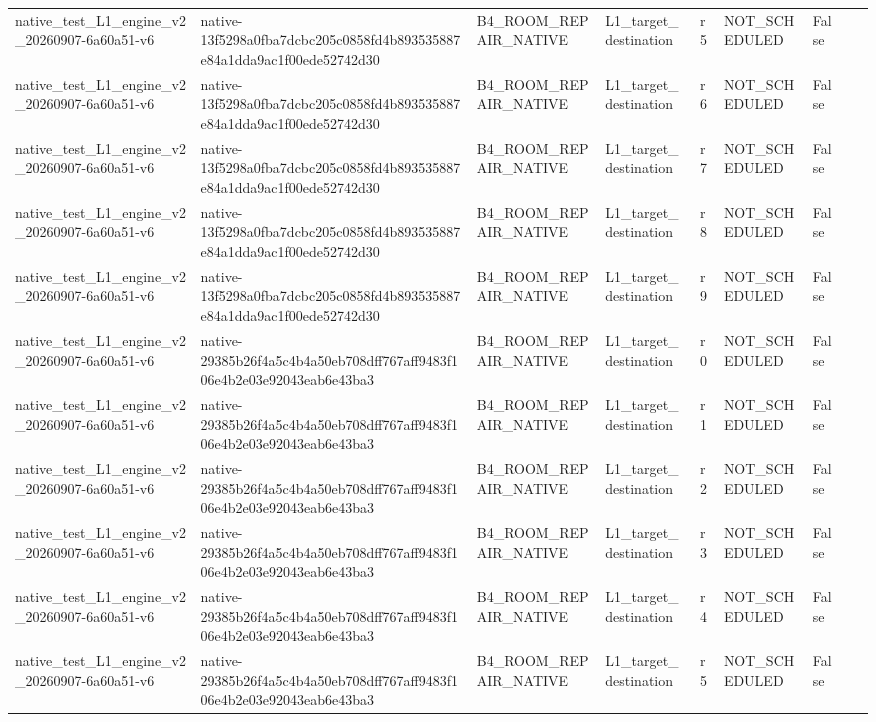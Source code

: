 \begin{tabular}{lllllllll}
native\_test\_L1\_engine\_v2\_20260907-6a60a51-v6 & native-13f5298a0fba7dcbc205c0858fd4b893535887e84a1dda9ac1f00ede52742d30 & B4\_ROOM\_REPAIR\_NATIVE & L1\_target\_destination & r5 & NOT\_SCHEDULED & False &  &  \\
native\_test\_L1\_engine\_v2\_20260907-6a60a51-v6 & native-13f5298a0fba7dcbc205c0858fd4b893535887e84a1dda9ac1f00ede52742d30 & B4\_ROOM\_REPAIR\_NATIVE & L1\_target\_destination & r6 & NOT\_SCHEDULED & False &  &  \\
native\_test\_L1\_engine\_v2\_20260907-6a60a51-v6 & native-13f5298a0fba7dcbc205c0858fd4b893535887e84a1dda9ac1f00ede52742d30 & B4\_ROOM\_REPAIR\_NATIVE & L1\_target\_destination & r7 & NOT\_SCHEDULED & False &  &  \\
native\_test\_L1\_engine\_v2\_20260907-6a60a51-v6 & native-13f5298a0fba7dcbc205c0858fd4b893535887e84a1dda9ac1f00ede52742d30 & B4\_ROOM\_REPAIR\_NATIVE & L1\_target\_destination & r8 & NOT\_SCHEDULED & False &  &  \\
native\_test\_L1\_engine\_v2\_20260907-6a60a51-v6 & native-13f5298a0fba7dcbc205c0858fd4b893535887e84a1dda9ac1f00ede52742d30 & B4\_ROOM\_REPAIR\_NATIVE & L1\_target\_destination & r9 & NOT\_SCHEDULED & False &  &  \\
native\_test\_L1\_engine\_v2\_20260907-6a60a51-v6 & native-29385b26f4a5c4b4a50eb708dff767aff9483f106e4b2e03e92043eab6e43ba3 & B4\_ROOM\_REPAIR\_NATIVE & L1\_target\_destination & r0 & NOT\_SCHEDULED & False &  &  \\
native\_test\_L1\_engine\_v2\_20260907-6a60a51-v6 & native-29385b26f4a5c4b4a50eb708dff767aff9483f106e4b2e03e92043eab6e43ba3 & B4\_ROOM\_REPAIR\_NATIVE & L1\_target\_destination & r1 & NOT\_SCHEDULED & False &  &  \\
native\_test\_L1\_engine\_v2\_20260907-6a60a51-v6 & native-29385b26f4a5c4b4a50eb708dff767aff9483f106e4b2e03e92043eab6e43ba3 & B4\_ROOM\_REPAIR\_NATIVE & L1\_target\_destination & r2 & NOT\_SCHEDULED & False &  &  \\
native\_test\_L1\_engine\_v2\_20260907-6a60a51-v6 & native-29385b26f4a5c4b4a50eb708dff767aff9483f106e4b2e03e92043eab6e43ba3 & B4\_ROOM\_REPAIR\_NATIVE & L1\_target\_destination & r3 & NOT\_SCHEDULED & False &  &  \\
native\_test\_L1\_engine\_v2\_20260907-6a60a51-v6 & native-29385b26f4a5c4b4a50eb708dff767aff9483f106e4b2e03e92043eab6e43ba3 & B4\_ROOM\_REPAIR\_NATIVE & L1\_target\_destination & r4 & NOT\_SCHEDULED & False &  &  \\
native\_test\_L1\_engine\_v2\_20260907-6a60a51-v6 & native-29385b26f4a5c4b4a50eb708dff767aff9483f106e4b2e03e92043eab6e43ba3 & B4\_ROOM\_REPAIR\_NATIVE & L1\_target\_destination & r5 & NOT\_SCHEDULED & False &  &  \\

\end{tabular}
